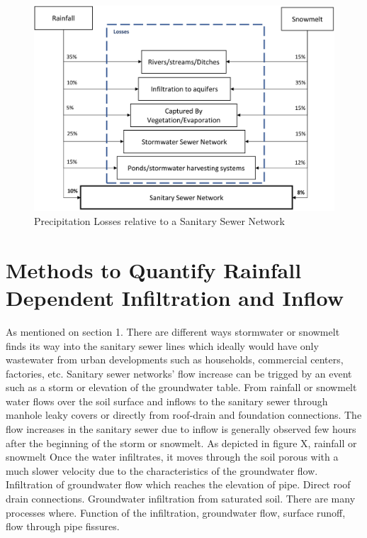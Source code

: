 \begin{figure}[h]
    \centering
	\includegraphics[scale=0.4]{figures/losses.png}
	\caption{Precipitation Losses relative to a Sanitary Sewer Network}
	\label{fig:losses}
\end{figure}

\section{Methods to Quantify Rainfall Dependent Infiltration and Inflow}


As mentioned on section 1. There are different ways stormwater or snowmelt finds its way into the sanitary sewer lines which ideally would have only wastewater from urban developments such as households, commercial centers, factories, etc.  Sanitary sewer networks’ flow increase can be trigged by an event such as a storm or elevation of the groundwater table. From rainfall or snowmelt water flows over the soil surface and inflows to the sanitary sewer through manhole leaky covers or directly from roof-drain and foundation connections. The flow increases in the sanitary sewer due to inflow is generally observed few hours after the beginning of the storm or snowmelt. As depicted in figure X, rainfall or snowmelt   Once the water infiltrates, it moves through the soil porous with a much slower velocity due to the characteristics of the groundwater flow. Infiltration of groundwater flow which reaches the elevation of pipe. Direct roof drain connections. Groundwater infiltration from saturated soil.   
There are many processes where. Function of the infiltration, groundwater flow, surface runoff, flow through pipe fissures.

